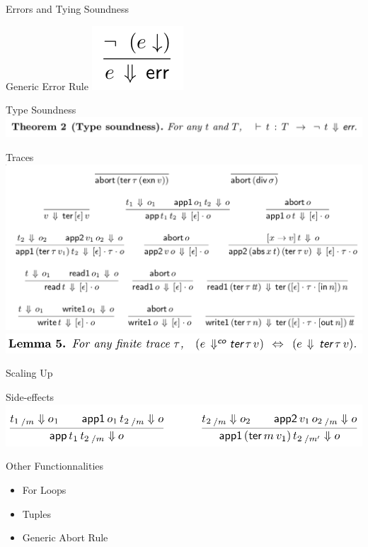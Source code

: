 \documentclass[page number,dvipsnames]{beamer}
\begin{document}
\begin{frame}{Errors and Tying Soundness}
  \begin{block}{Generic Error Rule}
    \center
    \includegraphics[scale=0.3]{error.png}
  \end{block}
  \vfill
  \begin{exampleblock}{Type Soundness}
    \center
    \includegraphics[scale=0.3]{thm2.png}
  \end{exampleblock}
\end{frame}

\begin{frame}{Traces}
  \center
  \includegraphics[scale=0.25]{traces.png}
  \vfill
  \includegraphics[scale=0.3]{lemma5.png}
\end{frame}

\begin{frame}{Scaling Up}
  \begin{block}{Side-effects}
    \center
    \includegraphics[scale=0.3]{side_effect.png}
  \end{block}
  \vfill
  \begin{block}{Other Functionnalities}
    \begin{itemize}
    \item For Loops
    \item Tuples
    \item Generic Abort Rule
    \end{itemize}
  \end{block}

\end{frame}
\end{document}
